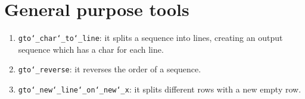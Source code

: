 \chapter{General purpose tools}
\label{seq}

\begin{enumerate}
\item \texttt{gto\char`_char\char`_to\char`_line}: it splits a sequence into lines, creating an output sequence which has a char for each line.

\item \texttt{gto\char`_reverse}: it reverses the order of a sequence.

\item \texttt{gto\char`_new\char`_line\char`_on\char`_new\char`_x}: it splits different rows with a new empty row.
\end{enumerate}



